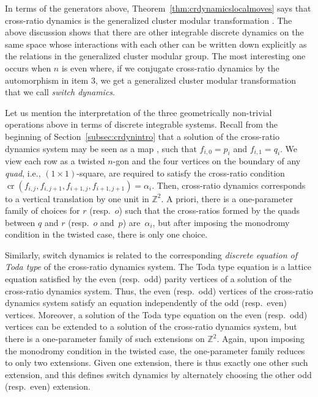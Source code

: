 \documentclass[10pt,a4paper]{amsart}
\numberwithin{equation}{section}
\newcommand{\myarrow}[1][-45]{%
	\mathrel{%
		\text{$
			\begin{tikzpicture}[baseline = -0.5ex]
				\node[inner sep=0pt,outer sep=0pt,rotate = #1] (a) at (0,0) {$\xrightarrow{}$};
			\end{tikzpicture}
			$}%
	}%
}%
\newcommand{\Z}{{\mathbb Z}}
\newcommand{\CP}{{\mathbb C\mathrm P}}
\newcommand{\ra}{\rightarrow}
\def\cro{\operatorname{cr}}
\begin{document}
	In terms of the generators above, Theorem~\ref{thm:crdynamicslocalmoves} says that cross-ratio dynamics is the generalized cluster modular transformation \smash{$\tau_{\ra} \tau_{\myarrow[135]}^{-1} s_{1,\ra}$}. The above discussion shows that there are other integrable discrete dynamics on the same space whose interactions with each other can be written down explicitly as the relations in the generalized cluster modular group. The most interesting one occurs when $n$ is even where, if we conjugate cross-ratio dynamics by the automorphism in item 3, we get a generalized cluster modular transformation that we call \textit{switch dynamics}.
	
Let us mention the interpretation of the three geometrically non-trivial operations above in terms of {discrete integrable systems}. Recall from the beginning of Section~\ref{subsec:crdynintro} that a solution of the cross-ratio dynamics system may be seen as a map \smash{$f\colon \Z^2 \rightarrow \CP^1$}, such that ${f_{i,0}=p_i}$ and ${f_{i,1}=q_i}$. We view each row as a twisted $n$-gon and the four vertices on the boundary of any \textit{quad}, i.e., $(1 \times 1)$-square, are required to satisfy the cross-ratio condition $\cro({f_{i,j}, f_{i,j+1},f_{i+1,j},f_{i+1,j+1}})=\alpha_i$. Then, cross-ratio dynamics corresponds to a vertical translation by one unit in $\Z^2$. A priori, there is a one-parameter family of choices for $r$ (resp.~$o$) such that the cross-ratios formed by the quads between $q$ and $r$ (resp.~$o$ and~$p$) are~$\alpha_i$, but after imposing the monodromy condition in the twisted case, there is only one choice.
	
	Similarly, switch dynamics is related to the corresponding \emph{discrete equation of Toda type} \cite{bsintegrablequads} of the cross-ratio dynamics system. The Toda type equation is a lattice equation satisfied by the even (resp.\ odd) parity vertices of a solution of the cross-ratio dynamics system. Thus, the even (resp.\ odd) vertices of the cross-ratio dynamics system satisfy an equation independently of the odd (resp.\ even) vertices. Moreover, a solution of the Toda type equation on the even (resp.\ odd) vertices can be extended to a solution of the cross-ratio dynamics system, but there is a one-parameter family of such extensions on $\Z^2$. Again, upon imposing the monodromy condition in the twisted case, the one-parameter family reduces to only two extensions. Given one extension, there is thus exactly one other such extension, and this defines switch dynamics by alternately choosing the other odd (resp.\ even) extension.
	
\end{document}
